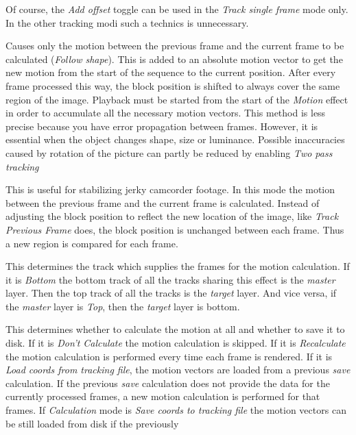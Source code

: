 \begin{description}
    Of course, the \textit{Add offset} toggle can be used in the \textit{Track single frame} mode only.  In the other tracking modi such a technics is unnecessary.
    \item[Track previous frame] Causes only the motion between the previous frame and
    the current frame to be calculated (\textit{Follow shape}).  This is added to an
    absolute motion vector to get the new motion from the start of the sequence
    to the current position.  After every frame processed this way, the block
    position is shifted to always cover the same region of the image.  Playback
    must be started from the start of the \textit{Motion} effect in order to accumulate
    all the necessary motion vectors.  This method is less precise because you
    have error propagation between frames.  However, it is essential when the
    object changes shape, size or luminance.  Possible inaccuracies caused by
    rotation of the picture can partly be reduced by enabling \textit{Two pass tracking}
    \item[Previous frame same block] This is useful for stabilizing jerky camcorder footage. In this mode the motion between the previous frame and the current frame is calculated. Instead of adjusting the block position to reflect the new location of the image, like \textit{Track Previous Frame} does, the block position is unchanged between each frame. Thus a new region is compared for each frame.
    \item[Master layer] This determines the track which supplies the frames for the
    motion calculation.  If it is \textit{Bottom} the bottom track of all the tracks
    sharing this effect is the \textit{master} layer.  Then the top track of all the
    tracks is the \textit{target} layer.  And vice versa, if the \textit{master} layer is \textit{Top},
    then the \textit{target} layer is bottom.
    \item[Calculation] This determines whether to calculate the motion at all and
    whether to save it to disk.  If it is \textit{Don't Calculate} the motion calculation is skipped.  If it is \textit{Recalculate} the motion calculation is performed every  time each frame is rendered.  If it is \textit{Load coords from tracking file}, the motion vectors are loaded  from a previous \textit{save} calculation.  If the previous \textit{save} calculation does not provide the data for the currently processed frames, a new motion  calculation is performed for that frames.  If \textit{Calculation} mode is \textit{Save coords to tracking file} the motion vectors can be still loaded from disk if the previously

\end{description}
